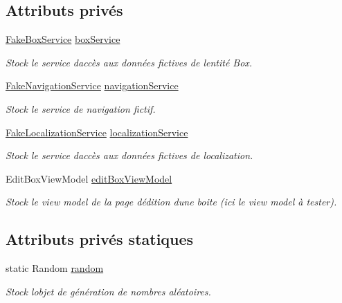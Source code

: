 \subsection*{Attributs privés}
\begin{DoxyCompactItemize}
\item 
\hyperlink{class_boxes_1_1_tests_1_1_mock_1_1_services_1_1_fake_box_service}{Fake\+Box\+Service} \hyperlink{class_boxes_1_1_tests_1_1_edit_box_view_model_tests_a7047dceb7858dea179eebe2e73c74e11}{box\+Service}
\begin{DoxyCompactList}\small\item\em Stock le service d\textquotesingle{}accès aux données fictives de l\textquotesingle{}entité Box. \end{DoxyCompactList}\item 
\hyperlink{class_boxes_1_1_tests_1_1_mock_1_1_services_1_1_fake_navigation_service}{Fake\+Navigation\+Service} \hyperlink{class_boxes_1_1_tests_1_1_edit_box_view_model_tests_ab23a9c5445ca502ef5fd0c9dd759b901}{navigation\+Service}
\begin{DoxyCompactList}\small\item\em Stock le service de navigation fictif. \end{DoxyCompactList}\item 
\hyperlink{class_boxes_1_1_tests_1_1_mock_1_1_services_1_1_fake_localization_service}{Fake\+Localization\+Service} \hyperlink{class_boxes_1_1_tests_1_1_edit_box_view_model_tests_aa9af1180862a777fd537253d02a83fd4}{localization\+Service}
\begin{DoxyCompactList}\small\item\em Stock le service d\textquotesingle{}accès aux données fictives de localization. \end{DoxyCompactList}\item 
Edit\+Box\+View\+Model \hyperlink{class_boxes_1_1_tests_1_1_edit_box_view_model_tests_ae401163363971887290a6f0fee30e5e9}{edit\+Box\+View\+Model}
\begin{DoxyCompactList}\small\item\em Stock le view model de la page d\textquotesingle{}édition d\textquotesingle{}une boite (ici le view model à tester). \end{DoxyCompactList}\end{DoxyCompactItemize}
\subsection*{Attributs privés statiques}
\begin{DoxyCompactItemize}
\item 
static Random \hyperlink{class_boxes_1_1_tests_1_1_edit_box_view_model_tests_a7c60410636b006143c6bd7fcf2107fd9}{random}
\begin{DoxyCompactList}\small\item\em Stock l\textquotesingle{}objet de génération de nombres aléatoires. \end{DoxyCompactList}\end{DoxyCompactItemize}


